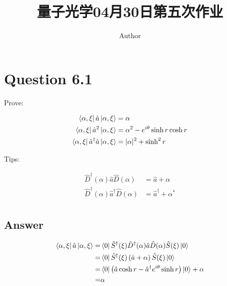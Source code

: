 \documentclass[twoside]{article}
\begin{document}
\title{量子光学04月30日第五次作业}
\author{Author}
\pagestyle{fancy}
\makeatletter
\fancyhead[L]{\@title}
\fancyhead[R]{\@author}
\makeatother
\setlength{\parindent}{0pt}



\section*{Question 6.1}
Prove:

\begin{equation*}
    \begin{split}
        \bra{\alpha, \xi } \hat{a} \ket{\alpha , \xi}                 & = \alpha                                 \\
        \bra{\alpha, \xi } \hat{a}^2 \ket{\alpha , \xi}               & = \alpha^2 - e^{i\theta} \sinh r \cosh r \\
        \bra{\alpha, \xi } \hat{a}^\dagger \hat{a} \ket{\alpha , \xi} & = |\alpha|^2 + \sinh^2 r
    \end{split}
\end{equation*}

Tips:

\begin{equation*}
    \begin{split}
        \hat{D}^\dagger (\alpha) \hat{a} \hat{D} (\alpha)         & = \hat{a} + \alpha           \\
        \hat{D}^\dagger (\alpha) \hat{a}^\dagger \hat{D} (\alpha) & = \hat{a}^\dagger + \alpha^* \\
    \end{split}
\end{equation*}

\subsection*{Answer}

\begin{equation*}
    \begin{split}
        \bra{\alpha, \xi } \hat{a} \ket{\alpha , \xi} = & \bra{0} \hat{S}^\dagger (\xi) \hat{D}^\dagger (\alpha)  \hat{a} \hat{D}(\alpha) \hat{S} (\xi) \ket{0} \\
        =                                               & \bra{0} \hat{S}^\dagger (\xi) \left(\hat{a} + \alpha\right) \hat{S} (\xi) \ket{0}                     \\
        =                                               & \bra{0} \left(\hat{a} \cosh r - \hat{a}^\dagger e^{i\theta} \sinh r\right)  \ket{0} + \alpha          \\
        =                                               & \alpha
    \end{split}
\end{equation*}
\end{document}
